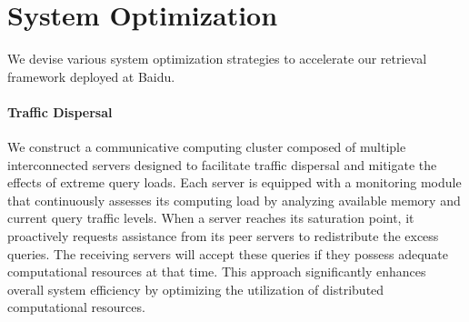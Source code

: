 \begin{algorithm}[t]
    \caption{Inter-query HiPANNS.}
    \label{gmpgr:alg:q_hipanns}
    \LinesNumbered
\end{algorithm}

\section{System Optimization}\label{gmpgr:sec:sys_op}

We devise various system optimization strategies to accelerate our retrieval framework deployed at Baidu.

\paragraph{Traffic Dispersal}
We construct a communicative computing cluster composed of multiple interconnected servers designed to facilitate traffic dispersal and mitigate the effects of extreme query loads.
Each server is equipped with a monitoring module that continuously assesses its computing load by analyzing available memory and current query traffic levels.
When a server reaches its saturation point, it proactively requests assistance from its peer servers to redistribute the excess queries. The receiving servers will accept these queries if they possess adequate computational resources at that time.
This approach significantly enhances overall system efficiency by optimizing the utilization of distributed computational resources.

